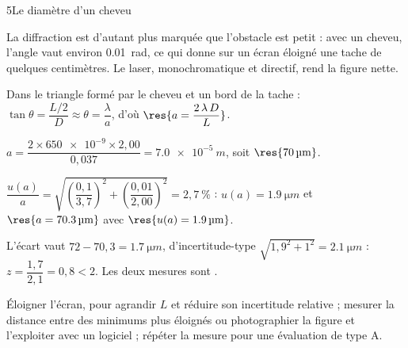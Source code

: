 \begin{corrigeBac}{5}{Le diamètre d'un cheveu}
\begin{questions}
\item La diffraction est d'autant plus marquée que l'obstacle est petit : avec un cheveu, l'angle vaut environ
\qty{0,01}{rad}, ce qui donne sur un écran éloigné une tache de quelques centimètres. Le laser, monochromatique et
directif, rend la figure nette. 
\item Dans le triangle formé par le cheveu et un bord de la tache : $\tan\theta=\dfrac{L/2}{D}\approx\theta=\dfrac{\lambda}{a}$, d'où
$\res{a=\dfrac{2\,\lambda\,D}{L}}$. \pts{1 pt}
\item $a=\dfrac{2\times\num{650e-9}\times2{,}00}{0{,}037}=\qty{7,0e-5}{m}$, soit $\res{\qty{70}{\micro m}}$. 
\item $\dfrac{u(a)}{a}=\sqrt{\left(\dfrac{0{,}1}{3{,}7}\right)^2+\left(\dfrac{0{,}01}{2{,}00}\right)^2}=2{,}7~\%$ : $u(a)=\qty{1,9}{\micro m}$ et $\res{a=\qty{70,3}{\micro m}}$ avec
$\res{u(a)=\qty{1,9}{\micro m}}$. \pts{1 pt}
\item L'écart vaut $72-70{,}3=\qty{1,7}{\micro m}$, d'incertitude-type $\sqrt{1{,}9^2+1^2}=\qty{2,1}{\micro m}$ : $z=\dfrac{1{,}7}{2{,}1}=0{,}8<2$. Les deux
mesures sont . \pts{1 pt}
\item Éloigner l'écran, pour agrandir $L$ et réduire son incertitude relative ; mesurer la distance entre des minimums plus
éloignés ou photographier la figure et l'exploiter avec un logiciel ; répéter la mesure pour une évaluation de type A. 
\end{questions}
\end{corrigeBac}

